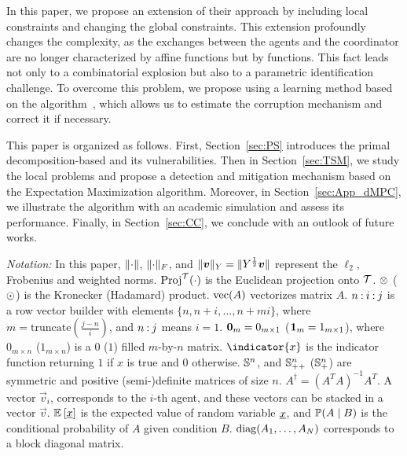 \documentclass{ifacconf}  %
\begin{document}
In this paper, we propose an extension of their approach by including local constraints and changing the global constraints.
This extension profoundly changes the complexity, as the exchanges between the agents and the coordinator are no longer characterized by affine functions but by \pwa{} functions.
This fact leads not only to a combinatorial explosion but also to a parametric identification challenge.
To overcome this problem, we propose using a learning method based on the \EM{} algorithm~\citep{DempsterEtAl1977}, which allows us to estimate the corruption mechanism and correct it if necessary.

This paper is organized as follows.
First, Section~\ref{sec:PS} introduces the primal decomposition-based \dmpc{} and its vulnerabilities.
Then in Section~\ref{sec:TSM}, we study the local problems and propose a detection and mitigation mechanism based on the Expectation Maximization algorithm.
Moreover, in Section~\ref{sec:App_dMPC}, we illustrate the algorithm with an academic simulation and assess its performance.
Finally, in Section~\ref{sec:CC}, we conclude with an outlook of future works.

\emph{Notation:}
In this paper, $\lVert\cdot\rVert$, $\lVert\cdot\rVert_{F}$, and ${\lVert\boldsymbol{v}\rVert_{Y}=\lVert Y^{\frac{1}{2}}\boldsymbol{v}\rVert}$ represent the $\ell_{2}$, Frobenius and weighted norms.
$\operatorname{Proj}^{\mathcal{T}}(\cdot)$ is the Euclidean projection onto $\mathcal{T}$.
$\mathbin{\otimes}$ ($\odot$) is the Kronecker (Hadamard) product.
$\mathrm{vec} (A)$ vectorizes matrix $A$.
${n\mathbin{:} i\mathbin{:} j}$ is a row vector builder with elements $\{n,n+i,\dots,n+mi\}$, where ${m=\mathrm{truncate}(\frac{j-n}{i})}$, and ${n\mathbin{:} j}$ means ${i=1}$.
${\mathbf{0}_{m}=0_{m\times 1}}$ (${\mathbf{1}_{m}=1_{m\times 1}}$), where
$0_{m\times n}$ ($1_{m\times n}$) is a $0$ ($1$) filled \mbox{$m$-by-$n$} matrix.
$\indicator{x}$ is the indicator function returning $1$ if $x$ is true and $0$ otherwise.
$\mathbb{S}^{n}$, and $\mathbb{S}_{++}^{n}$ ($\mathbb{S}_{+}^{n}$) are symmetric and positive (semi-)definite matrices of size $n$.
${A^{\dagger}={{(A^{T}A)}^{-1}A^{T}}}$.
A vector $\vec{v}_{i}$, corresponds to the $i$-th agent, and these vectors can be stacked in a vector $\vec{v}$.
$\mathbb{E}_{}\left[\underline{x}\right]$ is the expected value of random variable $\underline{x}$, and $\mathbb{P}(A \mid B)$ is the conditional probability of $A$ given condition $B$.
${\operatorname{diag}(A_{1},\dots,A_{N})}$ corresponds to a block diagonal matrix.
\end{document}
